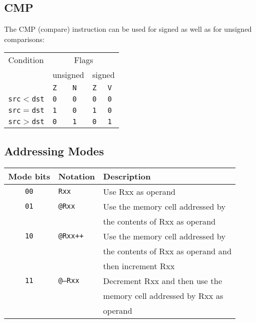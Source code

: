 \documentclass{leaflet}
\begin{document}
  \subsection{CMP}
   The CMP (compare) instruction can be used for signed as well as for unsigned
   comparisons:
   \begin{center}
    \vspace*{-2mm}
    \begin{longtable}{|l|l|l|l|l|}
     \hline
     Condition&\multicolumn{4}{|c|}{Flags}\\
              &\multicolumn{2}{|c|}{unsigned}&\multicolumn{2}{|c|}{signed}\\
              &\texttt{Z}&\texttt{N}&\texttt{Z}&\texttt{V}\\
     \hline
     \hline
     \texttt{src}$<$\texttt{dst}&\texttt{0}&\texttt{0}&\texttt{0}&\texttt{0}\\
     \texttt{src}$=$\texttt{dst}&\texttt{1}&\texttt{0}&\texttt{1}&\texttt{0}\\
     \texttt{src}$>$\texttt{dst}&\texttt{0}&\texttt{1}&\texttt{0}&\texttt{1}\\
     \hline
    \end{longtable}
    \vspace*{-8mm}
   \end{center}
%
  \subsection{Addressing Modes}
   {\scriptsize
    \begin{center}
     \begin{longtable}{|c|l|l|}
      \hline
       Mode bits&Notation&Description\\
      \hline
      \hline
       {\tt 00}&{\tt Rxx}&Use Rxx as operand\\
       {\tt 01}&{\tt @Rxx}&Use the memory cell addressed by\\
               &          &the contents of Rxx as operand\\
       {\tt 10}&{\tt @Rxx++}&Use the memory cell addressed by\\
               &          &the contents of Rxx as operand and\\
               &          &then increment Rxx\\
       {\tt 11}&{\tt @--Rxx}&Decrement Rxx and then use the\\
               &          &memory cell addressed by Rxx as\\
               &          &operand\\
      \hline
     \end{longtable}
    \end{center}
   }
   \vspace*{-10mm}
%
\end{document}
